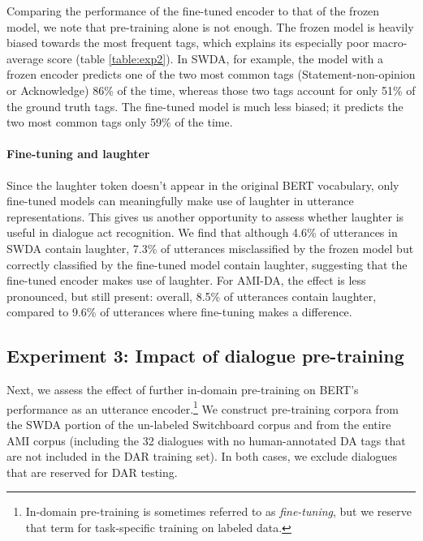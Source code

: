 \documentclass[11pt,a4paper]{article}
\begin{document}
Comparing the performance of the fine-tuned encoder to that of the frozen model, we note that pre-training alone is not enough.
The frozen model is heavily biased towards the most frequent tags, which explains its especially poor macro-average score (table \ref{table:exp2}).
In SWDA, for example, the model with a frozen encoder predicts one of the two most common tags (Statement-non-opinion or Acknowledge) 86\% of the time, whereas those two
tags account for only 51\% of the ground truth tags.
The fine-tuned model is much less biased; it predicts the two most common tags only 59\% of the time.




\paragraph{Fine-tuning and laughter}
Since the laughter token doesn't appear in the original BERT vocabulary, only fine-tuned models can meaningfully make use of laughter in utterance representations. 
This gives us another opportunity to assess whether laughter is useful in dialogue act recognition.
We find that although 4.6\% of utterances in SWDA contain laughter, 
7.3\% of utterances misclassified by the frozen model but correctly classified by the fine-tuned model contain laughter, 
suggesting that the fine-tuned encoder makes use of laughter. 
For AMI-DA, the effect is less pronounced, but still present: 
overall, 8.5\% of utterances contain laughter, 
compared to 9.6\% of utterances where fine-tuning makes a difference. 

\subsection{Experiment 3: Impact of dialogue pre-training} \label{sec:experiment3} %

Next, we assess the effect of further in-domain pre-training on BERT's performance as an utterance encoder.\footnote{
In-domain pre-training is sometimes referred to as \textit{fine-tuning}, but we reserve that term for task-specific training on labeled data.}
We construct pre-training corpora from the SWDA portion of the un-labeled Switchboard corpus and from the entire AMI corpus (including the 32 dialogues with no human-annotated DA tags that are not included in the DAR training set).
In both cases, we exclude dialogues that are reserved for DAR testing.
\end{document}
